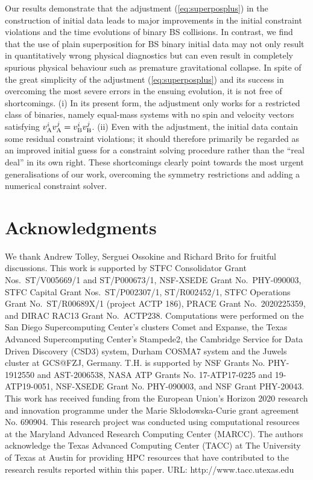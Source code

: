 \documentclass[]{iopart}
\begin{document}
Our results demonstrate that
the adjustment (\ref{eq:superposplus}) in the construction of initial
data leads to major improvements in the initial constraint violations and the
time evolutions of binary BS collisions. In contrast, we find that the use of plain
superposition for BS binary initial data may not only result in quantitatively
wrong physical diagnostics but can even result in completely spurious physical behaviour
such as premature gravitational collapse. In spite of the great simplicity of the
adjustment (\ref{eq:superposplus}) and its success in overcoming the most
severe errors in the ensuing evolution, it is not free of shortcomings.
(i) In its present form, the adjustment only works for a restricted class of
binaries, namely equal-mass systems with no spin and velocity vectors
satisfying $v_{\rm A}^i v_{\rm A}^j=v_{\rm B}^i v_{\rm B}^j$. (ii) Even with
the adjustment, the initial data contain some residual constraint violations;
it should therefore primarily be regarded as an improved initial guess for
a constraint solving procedure rather than the ``real deal'' in its own right.
These shortcomings clearly point towards the most urgent generalisations of our
work, overcoming the symmetry restrictions and adding a numerical constraint
solver.


\section*{Acknowledgments}
We thank Andrew Tolley, Serguei Ossokine and Richard Brito for fruitful discussions.
This work is supported by
STFC Consolidator Grant Nos.~ST/V005669/1 and ST/P000673/1,
NSF-XSEDE Grant No.~PHY-090003,
STFC Capital Grant Nos.~ST/P002307/1, ST/R002452/1,
STFC Operations Grant No.~ST/R00689X/1 (project ACTP 186),
PRACE Grant No.~2020225359,
and
DIRAC RAC13 Grant No.~ACTP238.
Computations were performed on
the San Diego Supercomputing Center's clusters Comet and Expanse,
the Texas Advanced Supercomputing Center's Stampede2,
the Cambridge Service for Data Driven Discovery (CSD3) system, Durham COSMA7 system
and
the Juwels cluster at GCS@FZJ, Germany.
T.H. is supported by NSF Grants No. PHY-1912550 and AST-2006538, NASA ATP Grants No. 17-ATP17-0225 and 19-ATP19-0051, NSF-XSEDE Grant No. PHY-090003, and NSF Grant PHY-20043. This work has received funding from the European Union’s Horizon 2020 research and innovation programme under the Marie Skłodowska-Curie grant agreement No. 690904. This research project was conducted using computational resources at the Maryland Advanced Research Computing Center (MARCC).
The authors acknowledge the Texas Advanced Computing Center (TACC) at The University of Texas at Austin for providing HPC resources that have contributed to the research results reported within this paper. URL: http://www.tacc.utexas.edu \cite{10.1145/3311790.3396656}
\end{document}
